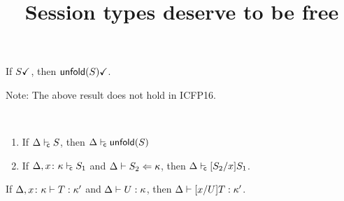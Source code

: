 \documentclass{article}
\title{Session types deserve to be free}
\begin{document}



\begin{lemma}
  If $\done S$, then $\done{\unfoldk(S)}$.  
\end{lemma}

Note: The above result does not hold in ICFP16.

\begin{lemma}\
  \begin{enumerate}
  \item If $\isContr S$, then $\isContr{\unfoldk(S)}$
  \item If $\isContr[\Delta,x\colon\kind]{S_1}$ and $\algkindin {S_2} \kind$,
    then $\isContr{\subs{S_2}{x}{S_1}}$.
  \end{enumerate}
\end{lemma}




\begin{lemma}
  If $\isType[\Delta,x\colon\kind] T\kind'$ and $\isType U\kind$, then
  $\isType{\subs xUT}{\kind'}$.
\end{lemma}


% 
% 
\end{document}

